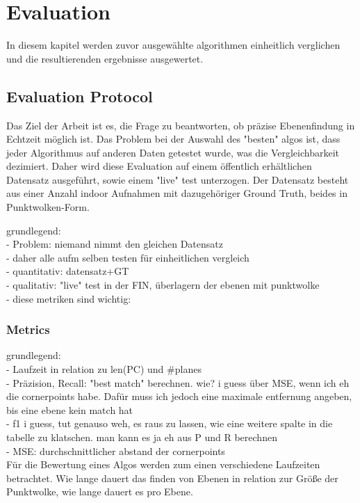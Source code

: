 \documentclass[main.tex]{subfiles}
\begin{document}
\chapter{Evaluation}

In diesem kapitel werden zuvor ausgewählte algorithmen einheitlich verglichen und die resultierenden ergebnisse ausgewertet.

\section{Evaluation Protocol}
Das Ziel der Arbeit ist es, die Frage zu beantworten, ob präzise Ebenenfindung in Echtzeit möglich ist.
Das Problem bei der Auswahl des "besten" algos ist, dass jeder Algorithmus auf anderen Daten getestet wurde, was die
Vergleichbarkeit dezimiert.
Daher wird diese Evaluation auf einem öffentlich erhältlichen Datensatz ausgeführt, sowie einem "live" test unterzogen.
Der Datensatz besteht aus einer Anzahl indoor Aufnahmen mit dazugehöriger Ground Truth, beides in Punktwolken-Form.

grundlegend: \\
- Problem: niemand nimmt den gleichen Datensatz \\
- daher alle aufm selben testen für einheitlichen vergleich \\
- quantitativ: datensatz+GT \\
- qualitativ: "live" test in der FIN, überlagern der ebenen mit punktwolke \\
- diese metriken sind wichtig: \\


\subsection{Metrics}
grundlegend: \\
- Laufzeit in relation zu len(PC) und \#planes \\
- Präzision, Recall: "best match" berechnen. wie? i guess über MSE, wenn ich eh die cornerpoints habe. Dafür muss ich jedoch eine maximale entfernung angeben, bis eine ebene kein match hat\\
- f1 i guess, tut genauso weh, es raus zu lassen, wie eine weitere spalte in die tabelle zu klatschen. man kann es ja eh aus P und R berechnen \\
- MSE: durchschnittlicher abstand der cornerpoints \\

Für die Bewertung eines Algos werden zum einen verschiedene Laufzeiten betrachtet. Wie lange dauert das finden von Ebenen
in relation zur Größe der Punktwolke, wie lange dauert es pro Ebene.
\end{document}
